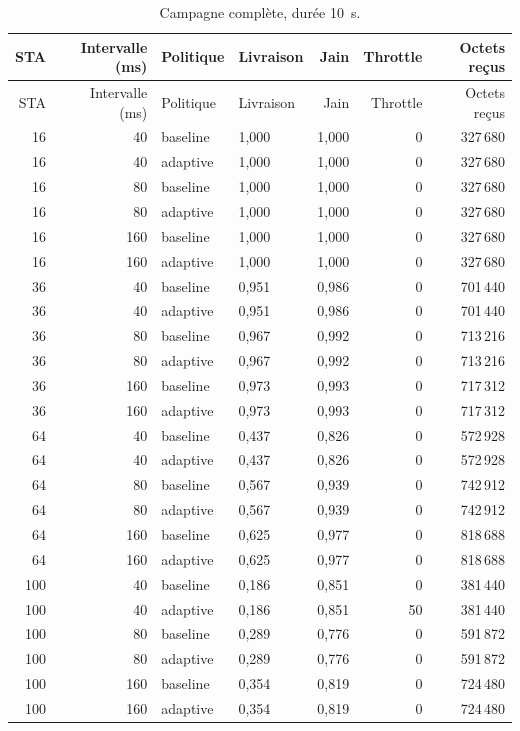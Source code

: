 \documentclass[11pt,a4paper]{article}
\begin{document}
\begin{longtable}{@{}rrllrrr@{}}
\caption{Campagne complète, durée 10~s.}\\
\toprule
STA & Intervalle (ms) & Politique & Livraison & Jain & Throttle & Octets reçus \\
\midrule
\endfirsthead
\toprule
STA & Intervalle (ms) & Politique & Livraison & Jain & Throttle & Octets reçus \\
\midrule
\endhead
16 & 40 & baseline & 1,000 & 1,000 & 0 & 327\,680 \\
16 & 40 & adaptive & 1,000 & 1,000 & 0 & 327\,680 \\
16 & 80 & baseline & 1,000 & 1,000 & 0 & 327\,680 \\
16 & 80 & adaptive & 1,000 & 1,000 & 0 & 327\,680 \\
16 & 160 & baseline & 1,000 & 1,000 & 0 & 327\,680 \\
16 & 160 & adaptive & 1,000 & 1,000 & 0 & 327\,680 \\
36 & 40 & baseline & 0,951 & 0,986 & 0 & 701\,440 \\
36 & 40 & adaptive & 0,951 & 0,986 & 0 & 701\,440 \\
36 & 80 & baseline & 0,967 & 0,992 & 0 & 713\,216 \\
36 & 80 & adaptive & 0,967 & 0,992 & 0 & 713\,216 \\
36 & 160 & baseline & 0,973 & 0,993 & 0 & 717\,312 \\
36 & 160 & adaptive & 0,973 & 0,993 & 0 & 717\,312 \\
64 & 40 & baseline & 0,437 & 0,826 & 0 & 572\,928 \\
64 & 40 & adaptive & 0,437 & 0,826 & 0 & 572\,928 \\
64 & 80 & baseline & 0,567 & 0,939 & 0 & 742\,912 \\
64 & 80 & adaptive & 0,567 & 0,939 & 0 & 742\,912 \\
64 & 160 & baseline & 0,625 & 0,977 & 0 & 818\,688 \\
64 & 160 & adaptive & 0,625 & 0,977 & 0 & 818\,688 \\
100 & 40 & baseline & 0,186 & 0,851 & 0 & 381\,440 \\
100 & 40 & adaptive & 0,186 & 0,851 & 50 & 381\,440 \\
100 & 80 & baseline & 0,289 & 0,776 & 0 & 591\,872 \\
100 & 80 & adaptive & 0,289 & 0,776 & 0 & 591\,872 \\
100 & 160 & baseline & 0,354 & 0,819 & 0 & 724\,480 \\
100 & 160 & adaptive & 0,354 & 0,819 & 0 & 724\,480 \\
\bottomrule
\end{longtable}
\end{document}
